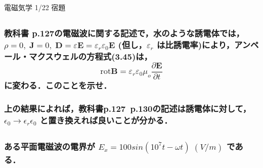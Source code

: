 \documentclass[a4paper, 12pt]{bxjsarticle}
\begin{document}
\begin{center}
    \begin{huge}
        電磁気学 1/22 宿題
    \end{huge}
\end{center}

\subsection{}
\subsubsection{教科書 p.127の電磁波に関する記述で，水のような誘電体では，%
\(\rho = 0,\;\boldsymbol{J} = 0,\;\boldsymbol{D}=\varepsilon  \boldsymbol{E} =\varepsilon _r \varepsilon _0 \boldsymbol{E}\)%
 (但し，\(\varepsilon _r\) は比誘電率)により，アンペール・マクスウェルの方程式(3.45)は，
\[\mathrm{rot} \boldsymbol{B} = \varepsilon _r \varepsilon _0 \mu_o \frac{\partial \boldsymbol{E}}{\partial t}\]に変わる．このことを示せ．}
\subsubsection{上の結果によれば，教科書p.127~p.130の記述は誘電体に対して，\(\epsilon _0 \rightarrow \epsilon_r \epsilon_0\) と置き換えれば良いことが分かる．}

\subsection{}
\subsubsection{ある平面電磁波の電界が \(E_x=100sin(10^7 t - \omega t)\;\si{(V/m)}\) である．}
\end{document}

